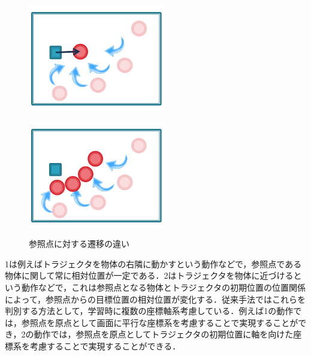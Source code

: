 \begin{figure}[h]
	\centering
	\begin{minipage}[t]{.4\textwidth}
		\centering
		\includegraphics[width=6cm]{figure2_2_sub_a.png} \\ %
		\label{subfigure:2_difference_displacement1}    
	\end{minipage}
	\begin{minipage}[t]{.4\textwidth}
		\centering
		\includegraphics[width=6cm]{figure2_2_sub_b.png} \\ %
		\label{subfigure:2_difference_displacement2}
	\end{minipage}
	\caption{参照点に対する遷移の違い}
	\label{figure:2_difference_displacement}
\end{figure}

1は例えばトラジェクタを物体の右隣に動かすという動作などで，参照点である物体に関して常に相対位置が一定である．2はトラジェクタを物体に近づけるという動作などで，これは参照点となる物体とトラジェクタの初期位置の位置関係によって，参照点からの目標位置の相対位置が変化する．従来手法ではこれらを判別する方法として，学習時に複数の座標軸系考慮している．例えば1の動作では，参照点を原点として画面に平行な座標系を考慮することで実現することができ，2の動作では，参照点を原点としてトラジェクタの初期位置に軸を向けた座標系を考慮することで実現することができる．

